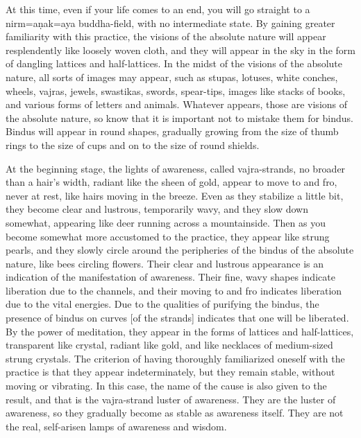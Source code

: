 \documentclass[11pt,twocolumn]{article}
\begin{document}
At this time, even if your life comes to an end, you will go straight
to a nirm\a={a}\d{n}ak\a={a}ya buddha\hyp{}field, with no intermediate
state. By gaining greater familiarity with this practice, the visions
of the absolute nature will appear resplendently like loosely woven
cloth, and they will appear in the sky in the form of dangling
lattices and half\hyp{}lattices. In the midst of the visions of the
absolute nature, all sorts of images may appear, such as stupas,
lotuses, white conches, wheels, vajras, jewels, swastikas, swords,
spear\hyp{}tips, images like stacks of books, and various forms of
letters and animals. Whatever appears, those are visions of the
absolute nature, so know that it is important not to mistake them for
bindus. Bindus will appear in round shapes, gradually growing from the
size of thumb rings to the size of cups and on to the size of round
shields.

At the beginning stage, the lights of awareness, called
vajra\hyp{}strands, no broader than a hair's width, radiant like the
sheen of gold, appear to move to and fro, never at rest, like hairs
moving in the breeze. Even as they stabilize a little bit, they become
clear and lustrous, temporarily wavy, and they slow down somewhat,
appearing like deer running across a mountainside. Then as you become
somewhat more accustomed to the practice, they appear like strung
pearls, and they slowly circle around the peripheries of the bindus of
the absolute nature, like bees circling flowers. Their clear and
lustrous appearance is an indication of the manifestation of
awareness. Their fine, wavy shapes indicate liberation due to the
channels, and their moving to and fro indicates liberation due to the
vital energies. Due to the qualities of purifying the bindus, the
presence of bindus on curves [of the strands] indicates that one will
be liberated. By the power of meditation, they appear in the forms of
lattices and half\hyp{}lattices, transparent like crystal, radiant
like gold, and like necklaces of medium\hyp{}sized strung
crystals. The criterion of having thoroughly familiarized oneself with
the practice is that they appear indeterminately, but they remain
stable, without moving or vibrating. In this case, the name of the
cause is also given to the result, and that is the vajra\hyp{}strand
luster of awareness. They are the luster of awareness, so they
gradually become as stable as awareness itself. They are not the real,
self\hyp{}arisen lamps of awareness and wisdom.
\end{document}

